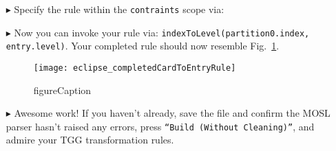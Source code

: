 \begin{itemize}
\item[$\blacktriangleright$] Specify the rule within the \texttt{contraints} scope via: 

\item[$\blacktriangleright$] Now you can invoke your rule via: \texttt{indexToLevel(partition0.index, entry.level)}. Your completed rule should now resemble
Fig.~\ref{fig:c2eDone}.

\begin{figure}[htbp]
\begin{center}
  \texttt{[image: eclipse\_completedCardToEntryRule]}
  \caption{figureCaption}
  \label{fig:c2eDone}
\end{center}
\end{figure}

\item[$\blacktriangleright$] Awesome work! If you haven't already, save the file and confirm the MOSL parser hasn't raised any errors, press
\texttt{``Build (Without Cleaning)''}, and admire your TGG transformation rules. 

\end{itemize}
